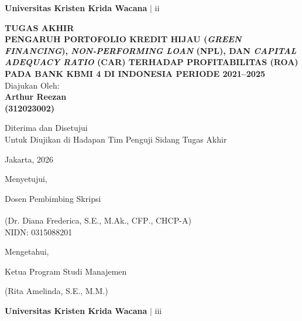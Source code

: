 \documentclass[12pt,a4paper]{article}
\newcommand{\ukrida}{Universitas Kristen Krida Wacana}
\newcommand{\nahamahasiswa}{Arthur Reezan}
\newcommand{\nim}{312023002}
\newcommand{\dosbim}{Dr. Diana Frederica, S.E., M.Ak., CFP\textsuperscript{\textregistered}., CHCP-A}
\newcommand{\nidn}{0315088201}
\newcommand{\ketprodi}{Rita Amelinda, S.E., M.M.}
\numberwithin{equation}{section}
\begin{document}
\vfill
\begin{flushright}
  \footnotesize\textbf{\ukrida} $|$ ii
\end{flushright}

\newpage
\thispagestyle{frontmatter}
\begin{center}
  {\large\bfseries TUGAS AKHIR}\\[0.6cm]
  {\large\bfseries
    PENGARUH PORTOFOLIO KREDIT HIJAU (\emph{GREEN FINANCING}),
    \emph{NON-PERFORMING LOAN} (NPL), DAN
    \emph{CAPITAL ADEQUACY RATIO} (CAR)
    TERHADAP PROFITABILITAS (ROA) PADA BANK KBMI 4
    DI INDONESIA PERIODE 2021--2025
  }\\[0.6cm]
  {\normalsize Diajukan Oleh:}\\[0.3cm]
  {\large\bfseries \nahamahasiswa}\\[0.2cm]
  {\large\bfseries (\nim)}
\end{center}

\vspace{0.6cm}
\noindent
Diterima dan Disetujui\\
Untuk Diujikan di Hadapan Tim Penguji Sidang Tugas Akhir

\vspace{0.4cm}
\noindent Jakarta, \underline{\hspace{3cm}} 2026

\vspace{0.4cm}
\noindent Menyetujui,

\vspace{0.4cm}
\noindent Dosen Pembimbing Skripsi

\vspace{2.2cm}
\noindent (\dosbim)\\
NIDN: \nidn

\vspace{0.8cm}
\noindent Mengetahui,

\vspace{0.4cm}
\noindent Ketua Program Studi Manajemen

\vspace{2.2cm}
\noindent (\ketprodi)

\vfill
\begin{flushright}
  \footnotesize\textbf{\ukrida} $|$ iii
\end{flushright}
\end{document}
